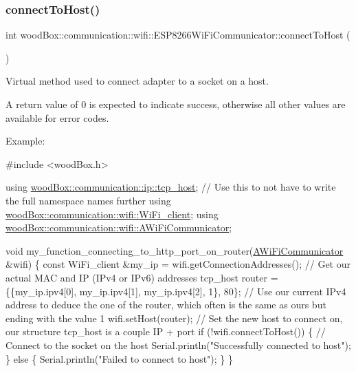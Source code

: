 \subsubsection{\texorpdfstring{connect\+To\+Host()}{connectToHost()}}
{\footnotesize\ttfamily int wood\+Box\+::communication\+::wifi\+::\+E\+S\+P8266\+Wi\+Fi\+Communicator\+::connect\+To\+Host (\begin{DoxyParamCaption}{ }\end{DoxyParamCaption})\hspace{0.3cm}{\ttfamily [virtual]}}

Virtual method used to connect adapter to a socket on a host.

A return value of 0 is expected to indicate success, otherwise all other values are available for error codes.

Example\+:


\begin{DoxyCode}
\textcolor{preprocessor}{#include <woodBox.h>}

\textcolor{keyword}{using} \mbox{\hyperlink{structwood_box_1_1communication_1_1ip_1_1s__host}{woodBox::communication::ip::tcp\_host}}; \textcolor{comment}{// Use this to not have to
       write the full namespace names further}
\textcolor{keyword}{using} \mbox{\hyperlink{structwood_box_1_1communication_1_1wifi_1_1s__wifi__client}{woodBox::communication::wifi::WiFi\_client}};
\textcolor{keyword}{using} \mbox{\hyperlink{classwood_box_1_1communication_1_1wifi_1_1_a_wi_fi_communicator}{woodBox::communication::wifi::AWiFiCommunicator}};

\textcolor{keywordtype}{void} my\_function\_connecting\_to\_http\_port\_on\_router(\mbox{\hyperlink{classwood_box_1_1communication_1_1wifi_1_1_a_wi_fi_communicator_a9d1dc13ca9243170b04211bef2b86ed2}{AWiFiCommunicator}} &wifi) \{
  \textcolor{keyword}{const} WiFi\_client &my\_ip = wifi.getConnectionAddresses(); \textcolor{comment}{// Get our actual MAC and IP (IPv4 or IPv6)
       addresses}
  tcp\_host router = \{\{my\_ip.ipv4[0], my\_ip.ipv4[1], my\_ip.ipv4[2], 1\}, 80\}; \textcolor{comment}{// Use our current IPv4 address
       to deduce the one of the router, which often is the same as ours but ending with the value 1}
  wifi.setHost(router); \textcolor{comment}{// Set the new host to connect on, our structure tcp\_host is a couple IP + port}
  \textcolor{keywordflow}{if} (!wifi.connectToHost()) \{ \textcolor{comment}{// Connect to the socket on the host}
    Serial.println(\textcolor{stringliteral}{"Successfully connected to host"});
  \} \textcolor{keywordflow}{else} \{
    Serial.println(\textcolor{stringliteral}{"Failed to connect to host"});
  \}
\}
\end{DoxyCode}
 

